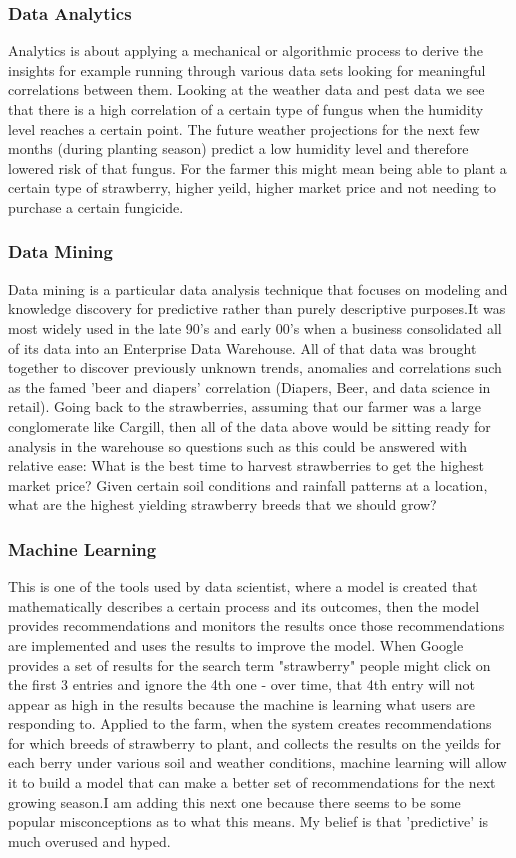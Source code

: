 \documentclass[a4paper,12pt,oneside]{report}
\begin{document}
{{\subsubsection{Data Analytics }
{Analytics is about applying a mechanical or algorithmic process to derive the insights for example running through various data sets looking for meaningful correlations between them. Looking at the weather data and pest data we see that there is a high correlation of a certain type of fungus when the humidity level reaches a certain point. The future weather projections for the next few months (during planting season) predict a low humidity level and therefore lowered risk of that fungus. For the farmer this might mean being able to plant a certain type of strawberry, higher yeild, higher market price and not needing to purchase a certain fungicide.}
\subsubsection{Data Mining }
{     Data mining is a particular data analysis technique that focuses on modeling and knowledge discovery for predictive rather than purely descriptive purposes.It was most widely used in the late 90's and early 00's when a business consolidated all of its data into an Enterprise Data Warehouse. All of that data was brought together to discover previously unknown trends, anomalies and correlations such as the famed 'beer and diapers' correlation (Diapers, Beer, and data science in retail). Going back to the strawberries, assuming that our farmer was a large conglomerate like Cargill, then all of the data above would be sitting ready for analysis in the warehouse so questions such as this could be answered with relative ease: What is the best time to harvest strawberries to get the highest market price? Given certain soil conditions and rainfall patterns at a location, what are the highest yielding strawberry breeds that we should grow?}
\subsubsection{Machine Learning }
{This is one of the tools used by data scientist, where a model is created that mathematically describes a certain process and its outcomes, then the model provides recommendations and monitors the results once those recommendations are implemented and uses the results to improve the model. When Google provides a set of results for the search term "strawberry" people might click on the first 3 entries and ignore the 4th one - over time, that 4th entry will not appear as high in the results because the machine is learning what users are responding to. Applied to the farm, when the system creates recommendations for which breeds of strawberry to plant, and collects the results on the yeilds for each berry under various soil and weather conditions, machine learning will allow it to build a model that can make a better set of recommendations for the next growing season.I am adding this next one because there seems to be some popular misconceptions as to what this means. My belief is that 'predictive' is much overused and hyped.}
}}
\end{document}
